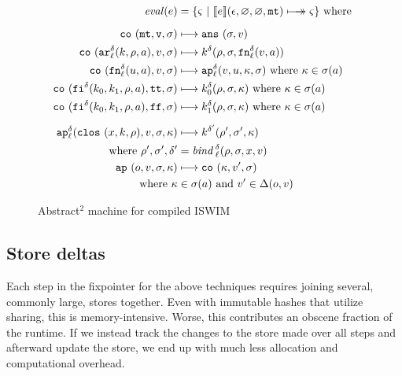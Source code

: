 \documentclass[preprint,onecolumn,9pt]{sigplanconf} %
\begin{document}
\begin{figure}
\begin{align*}
\mathit{eval}(\mexp) &= \{ \mstate\ |\ \compile{\mexp}(\epsilon,\varnothing,\varnothing,\kmt) \multimachstep \mstate \} \text{ where }
\\[2mm]
\co{\kmt,\mval,\msto} &\machstep
\ans{\msto,\mval}
\\
\co{\kar[^\mcntr_\mlab]{\mcomp,\menv,\maddr},\mval,\msto} & \machstep
\mcomp^\mcntr(\menv,\msto,\kfn[^\mcntr_\mlab]{\mval,\maddr})
\\
\co{\kfn[^\mcntr_\mlab]{{\mvalx{u}},\maddr},\mval,\msto} & \machstep
\ap[^\mcntr_\mlab]{\mval,\mvalx{u},\mkont,\msto}
\text{ where }\mkont \in \msto(\maddr)
\\
\co{\kif[^\mcntr]{\mcompi0,\mcompi1,\menv,\maddr},\strue,\msto} & \machstep
\mcompi0^\mcntr(\menv,\msto,\mkont)
\text{ where }\mkont\in\msto(\maddr)
\\
\co{\kif[^\mcntr]{\mcompi0,\mcompi1,\menv,\maddr},\sfalse,\msto} & \machstep
\mcompi1^\mcntr(\menv,\msto,\mkont)
\text{ where }\mkont\in\msto(\maddr)
\\[2mm]
\ap[^\mcntr_\mlab]{\clos{\mvar,\mcomp,\menv},\mval,\msto,\mkont} & \machstep
\mcomp^{\mcntr'}(\menv',\msto',\mkont) \\
\text{ where }\menv',\msto',\mcntr' &= \mathit{bind\,}^{ \mcntr}_\mlab(\menv,\msto,\mvar,\mval)
\\
\ap{\mop,\mval,\msto,\mkont} & \machstep
\co{\mkont,\mval',\msto} \\
\text{ where }\mkont &\in\msto(\maddr)
\text{ and } \mval'\in\interpdelta(\mop,\mval)
\end{align*}
\caption{Abstract$^2$ machine for compiled ISWIM}
\label{fig:caam}
\end{figure}



\newpage

\subsection{Store deltas}

Each step in the fixpointer for the above techniques requires joining
several, commonly large, stores together. Even with immutable hashes
that utilize sharing, this is memory-intensive. Worse, this
contributes an obscene fraction of the runtime. If we instead track
the changes to the store made over all steps and afterward update the
store, we end up with much less allocation and computational overhead.
\end{document}
